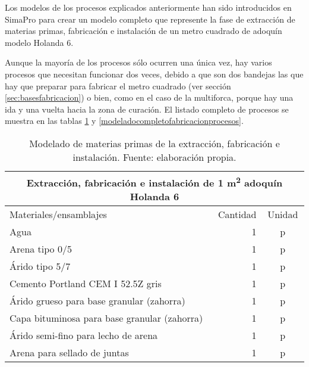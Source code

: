 Los modelos de los procesos explicados anteriormente han sido introducidos en SimaPro para crear un modelo completo que represente la fase de extracción de materias primas, fabricación e instalación de un metro cuadrado de adoquín modelo Holanda 6.

Aunque la mayoría de los procesos sólo ocurren una única vez, hay varios procesos que necesitan funcionar dos veces, debido a que son dos bandejas las que hay que preparar para fabricar el metro cuadrado (ver sección \ref{sec:basesfabricacion}) o bien, como en el caso de la multiforca, porque hay una ida y una vuelta hacia la zona de curación. El listado completo de procesos se muestra en las tablas \ref{modeladocompletofabricacionmaterias} y \ref{modeladocompletofabricacionprocesos}.

\begin{table}[!htp]
\centering
\begin{tabular}{p{8cm}rc}
\toprule
\multicolumn{3}{c}{Extracción, fabricación e instalación de 1 \si{m^2} adoquín Holanda 6}\\
\midrule
Materiales/ensamblajes & Cantidad & Unidad\\
\midrule
Agua & 1 & p\\
Arena tipo 0/5 & 1 & p\\
Árido tipo 5/7 & 1 & p\\
Cemento Portland CEM I 52.5Z gris & 1 & p\\
Árido grueso para base granular (zahorra) & 1 & p\\
Capa bituminosa para base granular (zahorra) & 1 & p\\
Árido semi-fino para lecho de arena & 1 & p\\
Arena para sellado de juntas & 1 & p\\
\bottomrule
\end{tabular}
\caption[Modelado de materias primas de la extracción, fabricación e instalación.]{Modelado de materias primas de la extracción, fabricación e instalación. Fuente: elaboración propia.}
\label{modeladocompletofabricacionmaterias}
\end{table}

